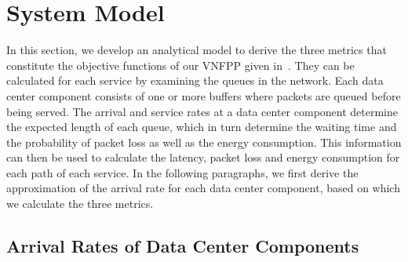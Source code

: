 
\section{System Model}
\label{sec:system_model}

In this section, we develop an analytical model to derive the three metrics that constitute the objective functions of our VNFPP given in~. They can be calculated for each service by examining the queues in the network. Each data center component consists of one or more buffers where packets are queued before being served. The arrival and service rates at a data center component determine the expected length of each queue, which in turn determine the waiting time and the probability of packet loss as well as the energy consumption. This information can then be used to calculate the latency, packet loss and energy consumption for each path of each service. In the following paragraphs, we first derive the approximation of the arrival rate for each data center component, based on which we calculate the three metrics. %

%
%
%
%
%

\subsection{Arrival Rates of Data Center Components}
\label{sec:arrival_rate}

